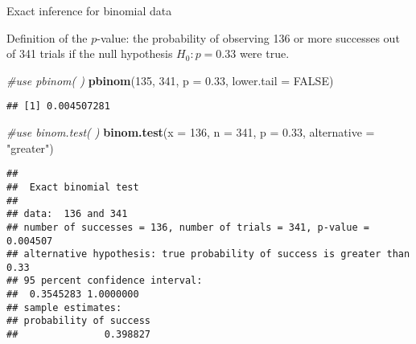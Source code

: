 \documentclass[
  ignorenonframetext,
  aspectratio=169]{beamer}
\newenvironment{Shaded}{\begin{snugshade}}{\end{snugshade}}
\newcommand{\AttributeTok}[1]{\textcolor[rgb]{0.13,0.29,0.53}{#1}}
\newcommand{\CommentTok}[1]{\textcolor[rgb]{0.56,0.35,0.01}{\textit{#1}}}
\newcommand{\ConstantTok}[1]{\textcolor[rgb]{0.56,0.35,0.01}{#1}}
\newcommand{\DecValTok}[1]{\textcolor[rgb]{0.00,0.00,0.81}{#1}}
\newcommand{\FloatTok}[1]{\textcolor[rgb]{0.00,0.00,0.81}{#1}}
\newcommand{\FunctionTok}[1]{\textcolor[rgb]{0.13,0.29,0.53}{\textbf{#1}}}
\newcommand{\NormalTok}[1]{#1}
\newcommand{\StringTok}[1]{\textcolor[rgb]{0.31,0.60,0.02}{#1}}
\begin{document}
\begin{frame}[fragile]{Exact inference for binomial data}
\protect\hypertarget{exact-inference-for-binomial-data}{}
\footnotesize

Definition of the \(p\)-value: the probability of observing 136 or more
successes out of 341 trials if the null hypothesis \(H_0: p = 0.33\)
were true.

\vspace{0.1cm}

\scriptsize

\begin{Shaded}
\begin{Highlighting}[]
\CommentTok{\#use pbinom( )}
\FunctionTok{pbinom}\NormalTok{(}\DecValTok{135}\NormalTok{, }\DecValTok{341}\NormalTok{, }\AttributeTok{p =} \FloatTok{0.33}\NormalTok{, }\AttributeTok{lower.tail =} \ConstantTok{FALSE}\NormalTok{)}
\end{Highlighting}
\end{Shaded}

\begin{verbatim}
## [1] 0.004507281
\end{verbatim}

\begin{Shaded}
\begin{Highlighting}[]
\CommentTok{\#use binom.test( )}
\FunctionTok{binom.test}\NormalTok{(}\AttributeTok{x =} \DecValTok{136}\NormalTok{, }\AttributeTok{n =} \DecValTok{341}\NormalTok{, }\AttributeTok{p =} \FloatTok{0.33}\NormalTok{, }\AttributeTok{alternative =} \StringTok{"greater"}\NormalTok{)}
\end{Highlighting}
\end{Shaded}

\begin{verbatim}
## 
##  Exact binomial test
## 
## data:  136 and 341
## number of successes = 136, number of trials = 341, p-value = 0.004507
## alternative hypothesis: true probability of success is greater than 0.33
## 95 percent confidence interval:
##  0.3545283 1.0000000
## sample estimates:
## probability of success 
##               0.398827
\end{verbatim}
\end{frame}
\end{document}
